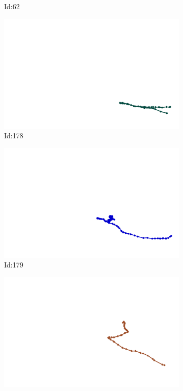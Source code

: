 \documentclass[12pt,twoside]{report}
\begin{document}
\begin{figure}
\begin{subfigure}[b]{0.20\textwidth}
\caption{Id:62}
\end{subfigure}
\begin{subfigure}[b]{0.20\textwidth}
\centering
\includegraphics[width=\textwidth]{../trajectories/178.png}
\caption{Id:178}
\end{subfigure}
\begin{subfigure}[b]{0.20\textwidth}
\centering
\includegraphics[width=\textwidth]{../trajectories/179.png}
\caption{Id:179}
\end{subfigure}
\begin{subfigure}[b]{0.20\textwidth}
\centering
\includegraphics[width=\textwidth]{../trajectories/205.png}

\end{subfigure}
\end{figure}
\end{document}
